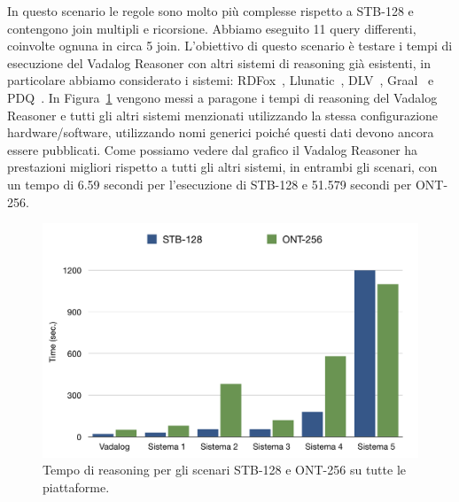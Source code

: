 In questo scenario le regole sono molto più complesse rispetto a STB-128 e contengono join multipli e ricorsione. Abbiamo eseguito 11 query differenti, coinvolte ognuna in circa 5 join. \newline
L'obiettivo di questo scenario è testare i tempi di esecuzione del Vadalog Reasoner con altri sistemi di reasoning già esistenti, in particolare abbiamo considerato i sistemi: RDFox~\cite{motik2014parallel}, Llunatic~\cite{geerts2014s}, DLV~\cite{leone2006dlv}, Graal~\cite{baget2015graal} e PDQ~\cite{benedikt2015querying}. \newline
In Figura~\ref{fig:ibenchgrafico} vengono messi a paragone i tempi di reasoning del Vadalog Reasoner e tutti gli altri sistemi menzionati utilizzando la stessa configurazione hardware/software, utilizzando nomi generici poiché questi dati devono ancora essere pubblicati. \newline
Come possiamo vedere dal grafico il Vadalog Reasoner ha prestazioni migliori rispetto a tutti gli altri sistemi, in entrambi gli scenari, con un tempo di 6.59 secondi per l'esecuzione di STB-128 e 51.579 secondi per ONT-256.
\begin{figure}[h]
	\centering
	\includegraphics[width=0.8\linewidth]{figure/ibenchgrafico}
	\caption{Tempo di reasoning per gli scenari STB-128 e ONT-256 su tutte le piattaforme.}
	\label{fig:ibenchgrafico}
\end{figure}